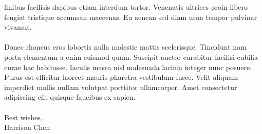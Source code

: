 \documentclass{cover_letter}
\begin{document}
finibus facilisis dapibus etiam interdum tortor. Venenatis ultrices proin libero feugiat tristique
accumsan maecenas. Eu aenean sed diam urna tempor pulvinar vivamus. \\~\\
Donec rhoncus eros lobortis nulla molestie mattis scelerisque. Tincidunt nam porta elementum a enim
euismod quam. Suscipit auctor curabitur facilisi cubilia curae hac habitasse. Iaculis massa nisl
malesuada lacinia integer nunc posuere. Purus est efficitur laoreet mauris pharetra vestibulum
fusce. Velit aliquam imperdiet mollis nullam volutpat porttitor ullamcorper. Amet consectetur
adipiscing elit quisque faucibus ex sapien. \\~\\

Best wishes, \\

Harrison Chen
\end{document}
